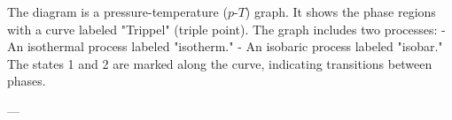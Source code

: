The diagram is a pressure-temperature (\( p \)-\( T \)) graph. It shows the phase regions with a curve labeled "Trippel" (triple point). The graph includes two processes:  
- An isothermal process labeled "isotherm."  
- An isobaric process labeled "isobar."  
The states 1 and 2 are marked along the curve, indicating transitions between phases.

---